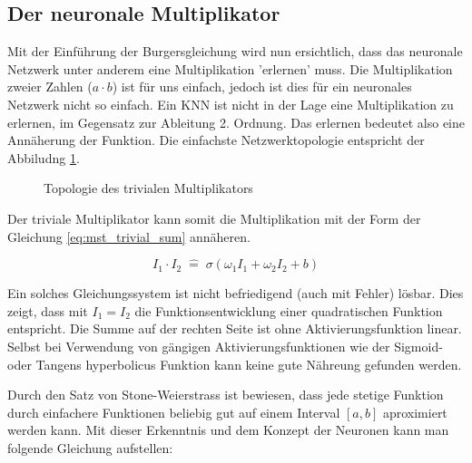 \subsection{Der neuronale Multiplikator}
Mit der Einführung der Burgersgleichung wird nun ersichtlich, dass das neuronale Netzwerk unter anderem eine Multiplikation 'erlernen' muss. Die Multiplikation zweier Zahlen ($a \cdot b$) ist für uns einfach, jedoch ist dies für ein neuronales Netzwerk nicht so einfach. Ein KNN ist nicht in der Lage eine Multiplikation zu erlernen, im Gegensatz zur Ableitung 2. Ordnung. Das erlernen bedeutet also eine Annäherung der Funktion. Die einfachste Netzwerktopologie entspricht der Abbiludng \ref{fig:mst_simple_multiplicator}.

\begin{figure}[h]
	\centering
	\label{fig:mst_simple_multiplicator}
	\caption{Topologie des trivialen Multiplikators}
\end{figure}

Der triviale Multiplikator kann somit die Multiplikation mit der Form der Gleichung \ref{eq:mst_trivial_sum} annäheren. 

\begin{equation}
I_{1} \cdot I_{2} \; \hat{=} \; \sigma \left( \omega_{1} I_1 + \omega_{2} I_2 + b \right) 
\label{eq:mst_traivial_sum}
\end{equation}

Ein solches Gleichungssystem ist nicht befriedigend (auch mit Fehler) lösbar. Dies zeigt, dass mit $I_1 = I_2$ die Funktionsentwicklung einer quadratischen Funktion entspricht. Die Summe auf der rechten Seite ist ohne Aktivierungsfunktion linear. Selbst bei Verwendung von gängigen Aktivierungsfunktionen wie der Sigmoid- oder Tangens hyperbolicus Funktion kann keine gute Nähreung gefunden werden. 

Durch den Satz von Stone-Weierstrass ist bewiesen, dass jede stetige Funktion durch einfachere Funktionen beliebig gut auf einem Interval $[a, b]$ aproximiert werden kann. Mit dieser Erkenntnis und dem Konzept der Neuronen kann man folgende Gleichung aufstellen:

